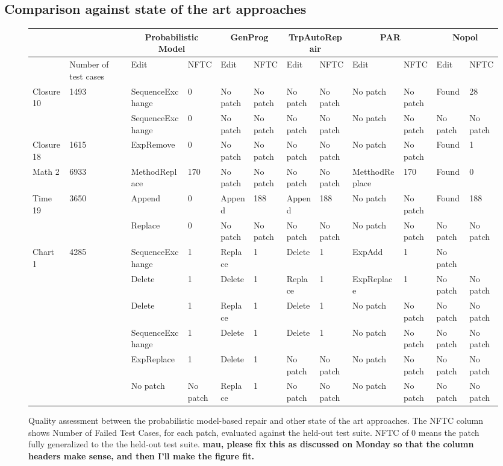 \documentclass[conference]{IEEEtran}
\newcommand{\todo}[1]
  {{\scriptsize \textbf{\color{red} {#1}}}}
\begin{document}
\subsection{Comparison against state of the art approaches}

 \begin{figure}
\centering
\begin{tabular}{l|l|ll|ll|ll|ll|ll}
\toprule
& & \multicolumn{2}{c|}{Probabilistic Model} & \multicolumn{2}{c|}{GenProg} & \multicolumn{2}{c|}{TrpAutoRepair} & \multicolumn{2}{c|}{PAR} & \multicolumn{2}{c|}{Nopol} \\
\midrule
  & Number of test cases & Edit & NFTC & Edit & NFTC & Edit & NFTC & Edit & NFTC & Edit  & NFTC  \\ 
\midrule
Closure 10 &1493 & SequenceExchange & 0 & No patch & No patch & No patch & No patch & No patch & No patch & Found & 28   \\
 & & SequenceExchange & 0 & No patch & No patch & No patch &No patch  & No patch & No patch & No patch & No patch   \\
\midrule
Closure 18 & 1615 & ExpRemove & 0  & No patch & No patch & No patch & No patch & No patch & No patch &Found &  1  \\
\midrule
Math 2 & 6933 & MethodReplace & 170 & No patch & No patch & No patch & No patch & MetthodReplace & 170 & Found & 0  \\
\midrule
Time 19 & 3650  & Append & 0 & Append & 188 & Append & 188 & No patch & No patch & Found &  188 \\
 & & Replace & 0 & No patch & No patch & No patch & No patch & No patch & No patch & No patch & No patch \\
\midrule
Chart 1 &  4285 & SequenceExchange & 1 & Replace & 1  & Delete & 1 & ExpAdd & 1 & No patch &   \\
 & & Delete & 1 & Delete & 1 & Replace &1  & ExpReplace & 1 & No patch & No patch   \\
 && Delete & 1 & Replace & 1 & Delete & 1 &  No patch& No patch& No patch & No patch  \\
 && SequenceExchange & 1 & Delete & 1 & Delete &1  & No patch & No patch & No patch & No patch   \\
 & & ExpReplace & 1 & Delete & 1 &No patch & No patch & No patch & No patch & No patch & No patch   \\
 & & No patch & No patch & Replace & 1 & No patch & No patch & No patch & No patch & No patch & No patch  \\
 \bottomrule
\end{tabular}
  \caption{Quality assessment between the probabilistic model-based repair and
    other state of the art approaches. The NFTC column shows Number of Failed
    Test Cases, for each patch, evaluated against the held-out test suite.  NFTC
    of 0 means the patch fully generalized to the the held-out test
    suite.\todo{mau, please fix this as discussed on Monday so that the column
      headers make sense, and then I'll make the figure fit.} \label{stateOfTheArtComparison}} 
\end{figure}
\end{document}
